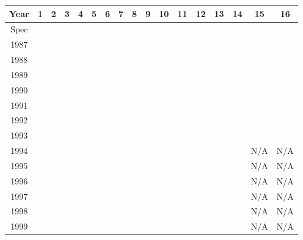 \begin{center}
    \begin{tabular}{c|cccccccccccccccc}
        Year & 1     & 2     & 3     & 4     & 5     & 6     & 7     & 8     & 9  & 10 & 11 & 12    & 13    & 14  & 15  & 16  \\
        \hline
        Spec &       &       &       &       &       &       &       &       &    &    &    &       &       &     &     &     \\
        1987 &       &       &       &       &       &       &       &       &    &    &    &       &       &     &     &     \\
        1988 &       &       &       &       &       &       &       &       &    &    &    &       &       &     &     &     \\
        1989 &       &       &       &       &       &       &       &       &    &    &    &       &       &     &     &     \\
        1990 &       &       &       &       &       &       &       &       &    &    &    &       &       &     &     &     \\
        1991 &       &       &       &       &       &       &       &       &    &    &    &       &       &     &     &     \\
        1992 &       &       &       &       &       &       &       &       &    &    &    &       &       &     &     &     \\
        1993 &       &       &       &       &       &       &       &       &    &    &    &       &       &     &     &     \\
        1994 &       &       &       &       &       &       &       &       &    &    &    &       &       &     & N/A & N/A \\
        1995 &       &       &       &       &       &       &       &       &    &    &    &       &       &     & N/A & N/A \\
        1996 &       &       &       &       &       &       &       &       &    &    &    &       &       &     & N/A & N/A \\
        1997 &       &       &       &       &       &       &       &       &    &    &    &       &       &     & N/A & N/A \\
        1998 &       &       &       &       &       &       &       &       &    &    &    &       &       &     & N/A & N/A \\
        1999 &       &       &       &       &       &       &       &       &    &    &    &       &       &     & N/A & N/A \\

\end{tabular}
\end{center}

